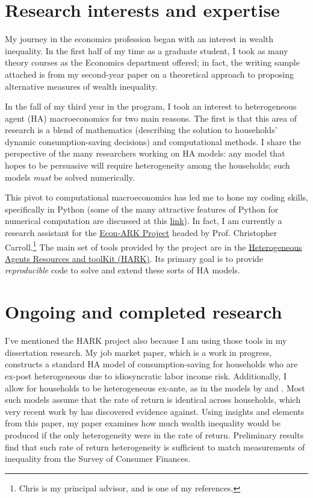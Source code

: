 \documentclass{scrartcl}
\begin{document}
%  

\section{Research interests and expertise}

My journey in the economics profession began with an interest in wealth inequality. In the first half of my time as a graduate student, I took as many theory courses as the Economics department offered; in fact, the writing sample attached is from my second-year paper on a theoretical approach to proposing alternative measures of wealth inequality.

In the fall of my third year in the program, I took an interest to heterogeneous agent (HA) macroeconomics for two main reasons. The first is that this area of research is a blend of mathematics (describing the solution to households' dynamic consumption-saving decisions) and computational methods. I share the perspective of the many researchers working on HA models: any model that hopes to be persuasive will require heterogeneity among the households; such models \textit{must} be solved numerically.

This pivot to computational macroeconomics has led me to hone my coding skills, specifically in Python (some of the many attractive features of Python for numerical computation are discussed at this \href{https://python-programming.quantecon.org/about_py.html}{link}). In fact, I am currently a research assistant for the \href{https://econ-ark.org}{Econ-ARK Project} headed by Prof. Christopher Carroll.\footnote{Chris is my principal advisor, and is one of my references.} The main set of tools provided by the project are in the \href{https://econ-ark.org/toolkit}{Heterogeneous Agents Resources and toolKit (HARK)}. Its primary goal is to provide \textit{reproducible} code to solve and extend these sorts of HA models.

\section{Ongoing and completed research}

I've mentioned the HARK project also because I am using those tools in my dissertation research. My job market paper, which is a work in progress, constructs a standard HA model of consumption-saving for households who are ex-post heterogeneous due to idiosyncratic labor income risk. Additionally, I allow for households to be heterogeneous ex-ante, as in the models by \cite{gkgv22} and \cite{cstw2017}. Most such models assume that the rate of return is identical across households, which very recent work by \cite{aflgdmlp20} has discovered evidence against. Using insights and elements from this paper, my paper examines how much wealth inequality would be produced if the only heterogeneity were in the rate of return. Preliminary results find that such rate of return heterogeneity is sufficient to match measurements of inequality from the Survey of Consumer Finances.
\end{document}
